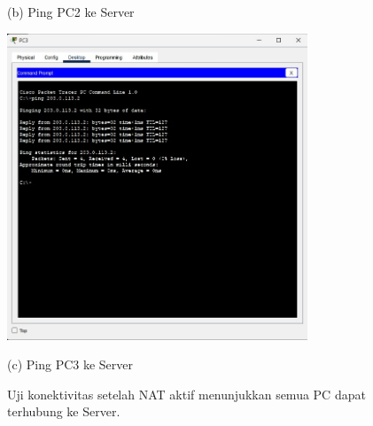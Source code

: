 \begin{enumerate}
\begin{figure}[H]
\begin{minipage}{0.48\textwidth}
            \caption*{(b) Ping PC2 ke Server}
        \end{minipage}
        \vspace{1em}
        \begin{minipage}{0.48\textwidth}
            \centering
            \includegraphics[width=0.8\textwidth]{img4/NATpingpc3.jpeg}
            \caption*{(c) Ping PC3 ke Server}
        \end{minipage}
        \caption{Uji konektivitas setelah NAT aktif menunjukkan semua PC dapat terhubung ke Server.}
    \end{figure}
\end{enumerate}

